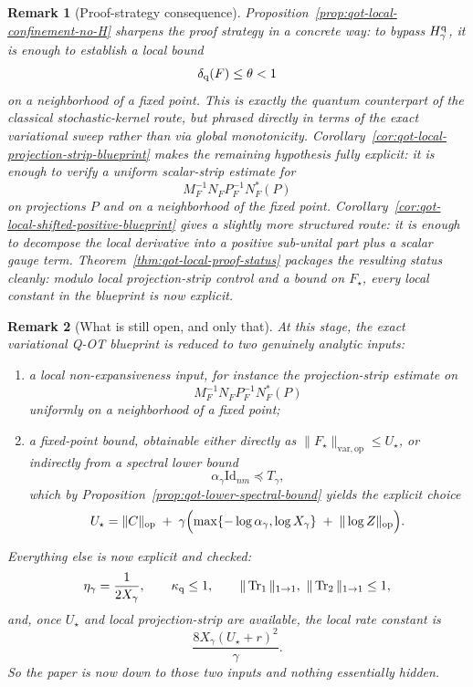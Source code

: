 \documentclass[11pt]{article}
\newcommand{\Id}{\mathrm{Id}}
\newcommand{\Trone}{\operatorname{Tr}_{1}}
\newcommand{\Trtwo}{\operatorname{Tr}_{2}}
\newcommand{\op}{\mathrm{op}}
\newcommand{\varop}{\mathrm{var},\op}
\theoremstyle{plain}
\newtheorem{remark}{Remark}[section]
\begin{document}
\begin{remark}[Proof-strategy consequence]
\label{rem:qot-local-dobrushin-strategy}
Proposition~\ref{prop:qot-local-confinement-no-H} sharpens the proof strategy in a concrete way:
to bypass $H_\gamma^{\rm q}$, it is enough to establish a local bound
\[
\delta_{\rm q}(F)\le \theta<1
\]
on a neighborhood of a fixed point.
This is exactly the quantum counterpart of the classical stochastic-kernel route, but phrased directly in terms of the exact variational sweep rather than via global monotonicity.
Corollary~\ref{cor:qot-local-projection-strip-blueprint} makes the remaining hypothesis fully explicit:
it is enough to verify a uniform scalar-strip estimate for
\[
M_F^{-1}N_F P_F^{-1}N_F^\ast(P)
\]
on projections $P$ and on a neighborhood of the fixed point.
Corollary~\ref{cor:qot-local-shifted-positive-blueprint} gives a slightly more structured route:
it is enough to decompose the local derivative into a positive sub-unital part plus a scalar gauge term.
Theorem~\ref{thm:qot-local-proof-status} packages the resulting status cleanly:
modulo local projection-strip control and a bound on $F_\star$, every local constant in the blueprint is now explicit.
\end{remark}

\begin{remark}[What is still open, and only that]
\label{rem:qot-status-two-inputs}
At this stage, the exact variational Q-OT blueprint is reduced to two genuinely analytic inputs:
\begin{enumerate}[label=\textnormal{(\roman*)}]
\item a local non-expansiveness input, for instance the projection-strip estimate on
\[
M_F^{-1}N_F P_F^{-1}N_F^\ast(P)
\]
uniformly on a neighborhood of a fixed point;
\item a fixed-point bound, obtainable either directly as $\|F_\star\|_{\varop}\le U_\star$, or indirectly from a spectral lower bound
\[
\alpha_\gamma \Id_{nm}\preceq T_\gamma,
\]
which by Proposition~\ref{prop:qot-lower-spectral-bound} yields the explicit choice
\[
U_\star
=
\|C\|_{\op}
\;+\;
\gamma\Bigl(
\max\{-\log \alpha_\gamma,\log X_\gamma\}
\;+\;
\|\log Z\|_{\op}
\Bigr).
\]
\end{enumerate}
Everything else is now explicit and checked:
\[
\eta_\gamma=\frac{1}{2X_\gamma},
\qquad
\kappa_{\rm q}\le 1,
\qquad
\|\Trone\|_{1\to 1},\ \|\Trtwo\|_{1\to 1}\le 1,
\]
and, once $U_\star$ and local projection-strip are available, the local rate constant is
\[
\frac{8X_\gamma(U_\star+r)^2}{\gamma}.
\]
So the paper is now down to those two inputs and nothing essentially hidden.
\end{remark}
\end{document}
